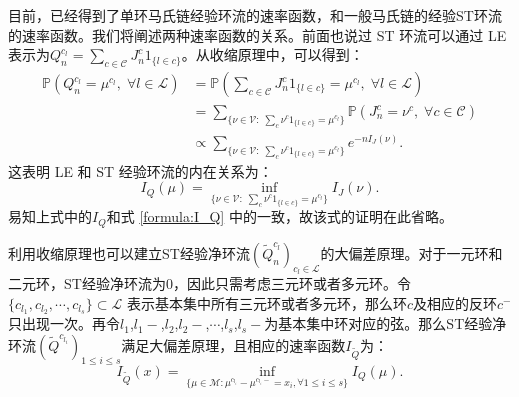 目前，已经得到了单环马氏链经验环流的速率函数，和一般马氏链的经验ST环流的速率函数。我们将阐述两种速率函数的关系。前面也说过 ST 环流可以通过 LE 表示为$Q_n^{c_l} = \sum_{c\in\mathcal{C}}J^c_n1_{\{l\in c\}}$。从收缩原理中，可以得到：
\begin{align*}
	\mathbb{P}\left(Q_n^{c_l}=\mu^{c_l},\;\forall l\in\mathcal{L}\right)
	&= \mathbb{P}\left(\sum_{c\in\mathcal{C}}J^c_n1_{\{l\in c\}}=\mu^{c_l},\;\forall l\in\mathcal{L}\right)\\
	&= \sum_{\{\nu\in\mathcal{V}:\;\sum_c\nu^c1_{\{l\in c\}}=\mu^{c_l}\}}
	\mathbb{P}\left(J^c_n=\nu^c,\;\forall c\in\mathcal{C}\right)\\
	&\propto \sum_{\{\nu\in\mathcal{V}:\;\sum_c\nu^c1_{\{l\in c\}}=\mu^{c_l}\}}e^{-nI_J(\nu)}.
\end{align*}
这表明 LE 和 ST 经验环流的内在关系为：
\begin{equation*}
	I_Q(\mu) = \inf_{\{\nu\in\mathcal{V}:\;\sum_c\nu^c1_{\{l\in c\}}=\mu^{c_l}\}}I_J(\nu).
\end{equation*}
易知上式中的$I_Q$和式 \eqref{formula:I_Q} 中的一致，故该式的证明在此省略。

利用收缩原理也可以建立ST经验净环流$(\tilde{Q}^{c_l}_n)_{c_l\in\mathcal{L}}$的大偏差原理。对于一元环和二元环，ST经验净环流为0，因此只需考虑三元环或者多元环。令$\{c_{l_1}, c_{l_2}, \cdots, c_{l_s}\} \subset \mathcal{L}$ 表示基本集中所有三元环或者多元环，那么环$c$及相应的反环$c^-$只出现一次。再令$l_1$,$l_1-$,$l_2$,$l_2-$,$\cdots$,$l_s$,$l_s-$为基本集中环对应的弦。那么ST经验净环流$(\tilde{Q}^{c_{l_i}})_{1\le i\le s}$满足大偏差原理，且相应的速率函数$I_{\tilde{Q}}$为：
\begin{equation}\label{I_Q2}
	I_{\tilde{Q}}(x)=\inf_{\{\mu\in\mathcal{M}:\mu^{c_{l_{i}}}-\mu^{c_{l_{i}}-}= x_i,\forall 1\le i\le s\}}I_Q(\mu).
\end{equation}